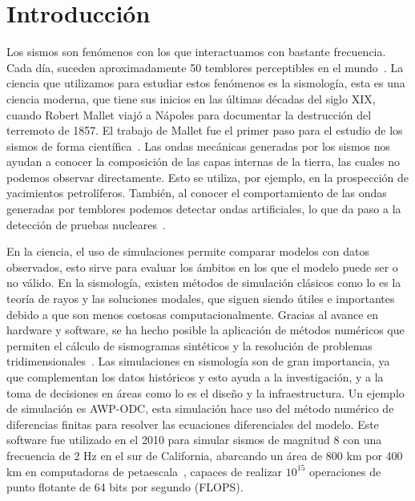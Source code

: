 \chapter{Introducción}
Los sismos son fenómenos con los que interactuamos con bastante frecuencia. Cada día, suceden aproximadamente 50 temblores perceptibles en el mundo~\cite{Shearer2019}. La ciencia que utilizamos para estudiar estos fenómenos es la sismología, esta es una ciencia moderna, que tiene sus inicios en las últimas décadas del siglo XIX, cuando Robert Mallet viajó a Nápoles para documentar la destrucción del terremoto de 1857. El trabajo de Mallet fue el primer paso para el estudio de los sismos de forma científica~\cite{Shearer2019}. Las ondas mecánicas generadas por los sismos nos ayudan a conocer la composición de las capas internas de la tierra, las cuales no podemos observar directamente. Esto se utiliza, por ejemplo, en la prospección de yacimientos petrolíferos. También, al conocer el comportamiento de las ondas generadas por temblores podemos detectar ondas artificiales, lo que da paso a la detección de pruebas nucleares~\cite{Shearer2019}.

En la ciencia, el uso de simulaciones permite comparar modelos con datos observados, esto sirve para evaluar los ámbitos en los que el modelo puede ser o no válido. En la sismología, existen métodos de simulación clásicos como lo es la teoría de rayos y las soluciones modales, que siguen siendo útiles e importantes debido a que son menos costosas computacionalmente. Gracias al avance en hardware y software, se ha hecho posible la aplicación de métodos numéricos que permiten el cálculo de sismogramas sintéticos y la resolución de problemas tridimensionales~\cite{Igel2016}. Las simulaciones en sismología son de gran importancia, ya que complementan los datos históricos y esto ayuda a la investigación, y a la toma de decisiones en áreas como lo es el diseño y la infraestructura. Un ejemplo de simulación es AWP-ODC, esta simulación hace uso del método numérico de diferencias finitas para resolver las ecuaciones diferenciales del modelo. Este software fue utilizado en el 2010 para simular sismos de magnitud 8 con una frecuencia de 2 Hz en el sur de California, abarcando un área de 800 km por 400 km en computadoras de petaescala~\cite{Cui2010}, capaces de realizar $10^{15}$ operaciones de punto flotante de 64 bits por segundo (FLOPS).

